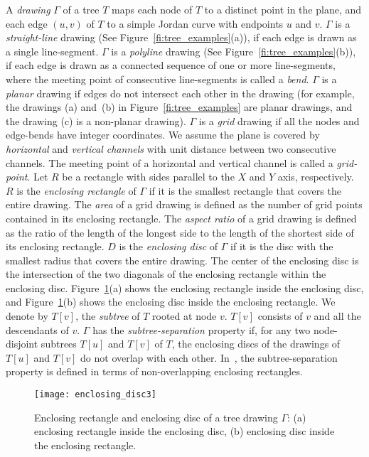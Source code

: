 \documentclass[10pt,psfig]{article}
\begin{document}
{A {\em drawing} $\Gamma$ of a tree $T$
maps each node of $T$ to a distinct point in the plane, and each
edge $(u,v)$ of $T$ to a simple Jordan curve with endpoints $u$
and $v$. $\Gamma$ is a {\em straight-line} drawing (See
Figure~\ref{fi:tree_examples}(a)), if each edge is drawn as a single
line-segment. $\Gamma$ is a {\em polyline} drawing (See
Figure~\ref{fi:tree_examples}(b)), if each edge is drawn as a connected
sequence of one or more line-segments, where the meeting point of
consecutive line-segments is called a {\em bend}. 
$\Gamma$ is a {\em planar} drawing if edges do not
intersect each other in the drawing (for example, the drawings
(a) and~(b) in Figure~\ref{fi:tree_examples} are planar drawings,
and the drawing (c) is a non-planar drawing). 
$\Gamma$ is a {\em grid} drawing if  all the nodes
and edge-bends have integer coordinates. We assume the plane is
covered by {\em horizontal} and {\em vertical channels} with unit
distance between two consecutive channels. The meeting point of a
horizontal and vertical channel is called a {\em grid-point}. Let
$R$ be a rectangle with sides parallel to the $X$ and $Y$ axis,
respectively. $R$ is the  {\em enclosing rectangle} of $\Gamma$ if
it is the smallest rectangle that covers the entire drawing. The
{\em area} of a grid drawing is defined as the number of grid
points contained in its enclosing rectangle. The {\em aspect
ratio} of a grid drawing is defined as the ratio of the length of
the longest side to the length of the shortest side of its
enclosing rectangle.
$D$ is the {\em enclosing disc} of $\Gamma$ if it is the disc with the smallest radius that covers the entire drawing.
The center of the enclosing disc is the intersection of the two diagonals of the enclosing rectangle within the enclosing disc.
Figure~\ref{fig_enclosing_disc}(a) shows the enclosing rectangle inside the enclosing disc, and Figure~\ref{fig_enclosing_disc}(b) shows the enclosing disc inside the enclosing rectangle.
We denote by $T[v]$, the {\em subtree} of $T$
rooted at node $v$. $T[v]$ consists of $v$ and all the descendants
of $v$.
$\Gamma$ has the {\em subtree-separation}
property if, for any two node-disjoint subtrees
$T[u]$ and $T[v]$ of $T$, the enclosing discs of the drawings
of $T[u]$ and $T[v]$ do not overlap with each other.
In~\cite{cgkt-02}, the subtree-separation property is defined in terms of non-overlapping enclosing rectangles.

\begin{figure}[htb]
\centering
\texttt{[image: enclosing\_disc3]}
\caption{Enclosing rectangle and enclosing disc of a tree drawing $\Gamma$: 
(a) enclosing rectangle inside the enclosing disc, (b) enclosing disc inside the enclosing rectangle.}
\label{fig_enclosing_disc}
\end{figure}

}
\end{document}

